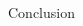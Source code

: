 \documentclass[final,hyperref={pdfpagelabels=false}]{beamer}
\begin{document}
\begin{frame}[t]
\begin{columns}[t]
\begin{column}{.465\textwidth}
\begin{block}{Conclusion}
\end{block}

%
%        
%
%
%
%
%


%
%
%


\end{column} %

\begin{column}{.015\textwidth}\end{column} %

\end{columns} %

\end{frame} %
\end{document}
